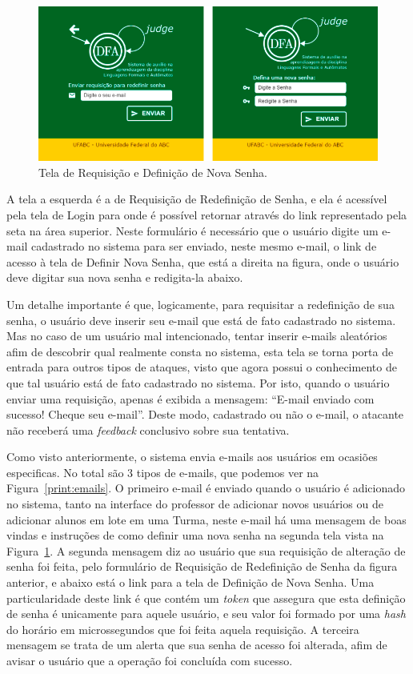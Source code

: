 \documentclass[
	12pt,				%
	openany,
	oneside,
	a4paper,			%
	english,			%
	brazil				%
	]{abntex2}
\begin{document}
\begin{figure}[H]
  \centering
  \includegraphics[width=\textwidth]{prints/resetnovaSenha.png}
  \caption{Tela de Requisição e Definição de Nova Senha.}
  \label{print:resetNovaSenha}
  \vspace{-0.5cm}
\end{figure}

  A tela a esquerda é a de Requisição de Redefinição de Senha, e ela é acessível pela tela de Login para onde é possível retornar através do link representado pela seta na área superior. Neste formulário é necessário que o usuário digite um e-mail cadastrado no sistema para ser enviado, neste mesmo e-mail, o link de acesso à tela de Definir Nova Senha, que está a direita na figura, onde o usuário deve digitar sua nova senha e redigita-la abaixo.
  
  Um detalhe importante é que, logicamente, para requisitar a redefinição de sua senha, o usuário deve inserir seu e-mail que está de fato cadastrado no sistema. Mas no caso de um usuário mal intencionado, tentar inserir e-mails aleatórios afim de descobrir qual realmente consta no sistema, esta tela se torna porta de entrada para outros tipos de ataques, visto que agora possui o conhecimento de que tal usuário está de fato cadastrado no sistema. Por isto, quando o usuário enviar uma requisição, apenas é exibida a mensagem: ``E-mail enviado com sucesso! Cheque seu e-mail''. Deste modo, cadastrado ou não o e-mail, o atacante não receberá uma \textit{feedback} conclusivo sobre sua tentativa.

  Como visto anteriormente, o sistema envia e-mails aos usuários em ocasiões especificas. No total são 3 tipos de e-mails, que podemos ver na Figura~\ref{print:emails}. O primeiro e-mail é enviado quando o usuário é adicionado no sistema, tanto na interface do professor de adicionar novos usuários ou de adicionar alunos em lote em uma Turma, neste e-mail há uma mensagem de boas vindas e instruções de como definir uma nova senha na segunda tela vista na Figura~\ref{print:resetNovaSenha}. A segunda mensagem diz ao usuário que sua requisição de alteração de senha foi feita, pelo formulário de Requisição de Redefinição de Senha da figura anterior, e abaixo está o link para a tela de Definição de Nova Senha. Uma particularidade deste link é que contém um \textit{token} que assegura que esta definição de senha é unicamente para aquele usuário, e seu valor foi formado por uma \textit{hash} do horário em microssegundos que foi feita aquela requisição. A terceira mensagem se trata de um alerta que sua senha de acesso foi alterada, afim de avisar o usuário que a operação foi concluída com sucesso.
\end{document}
